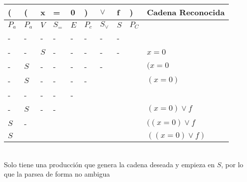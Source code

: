\documentclass{article}
\begin{document}
\begin{enumerate}
\begin{tabular}{ |l|l|l|l|l|l|l|l|l||l|}
  \hline
 ( & ( & x & = & 0 & ) & $\vee$ & f & ) & Cadena Reconocida \\
\hline  
$P_a$ & $P_a$ & $V$ & $S_=$ & $E$ & $P_c$ & $S_{\vee}$ & $S$ & $P_C$ &\\
 - & - & - & - & - & - & -  & - & &\\
 - & - & $S$ & - & - & - & -  & - & & $x=0$\\
 - & $S$ & - & - & - & - & - &  & & $(x=0$\\
 - & $S$  & - & - & - & - &  &  & & $(x=0)$\\
 - & -  & - & - & - &  &  &  & & \\
 - & $S$ & - & - &  &  &  &  & &  $(x=0) \vee f$ \\
 $S$ & - &  &  &  &  &  &  & &  $((x=0) \vee f$ \\
 $S$ &  &  &  &  &  &  &  & &  $((x=0) \vee f)$ \\
\hline  
\end{tabular}\\
Solo tiene una producción que genera la cadena deseada y empieza en $S$, por lo que la parsea de forma no ambigua

\end{enumerate}
\end{document}
